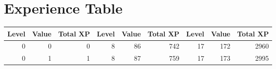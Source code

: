 \section{Experience Table}\label{sec:app-tab-xp}

\begin{longtable}[c]{DDD|DDD|DDD}
    \toprule
    Level & Value & Total XP & Level & Value & Total XP & Level & Value & Total XP \\ \midrule \endhead%
0 & 0 & 0 & 8 & 86 & 742 & 17 & 172 & 2960 \\
0 & 1 & 1 & 8 & 87 & 759 & 17 & 173 & 2995 \\
\end{longtable}